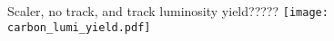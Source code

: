 \begin{Mfigure}{Scaler, no track, and track luminosity yield?????}
  \centering
  \texttt{[image: carbon\_lumi\_yield.pdf]}
  \caption{The HMS Carbon-12 scaler (left), no track (middle) and track (right) yields for runs taken at $P_{HMS}$=-3.09, $\theta_{HMS}$=35.010.}
  \label{fig:3-4_carbon_lumi_yield}
\end{Mfigure}

